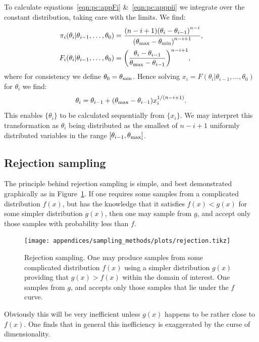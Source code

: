 To calculate equations~\eqref{eqn:pc:appFi} \&~\ref{eqn:pc:apppii} we integrate over the constant distribution, taking care with the limits. We find:
\begin{align}
  \pi_i(\theta_i|\theta_{i-1},\ldots,\theta_0) &= \frac{(n-i+1){(\theta_i-\theta_{i-1})}^{n-i}}{{(\theta_{\mathrm{max}}-\theta_{\mathrm{min}})}^{n-i+1}},\\
  F_i(\theta_i|\theta_{i-1},\ldots,\theta_0) &= {\left(\frac{\theta_i-\theta_{i-1}}{\theta_{\mathrm{max}}-\theta_{i-1}}\right)}^{n-i+1},
  \label{eqn:pc:sorted_uniform_calc}
\end{align}
where for consistency we define $\theta_0 = \theta_{\mathrm{min}}$. Hence solving $x_i=F(\theta_i|\theta_{i-1},\ldots,\theta_0)$ for $\theta_i$ we find:
\begin{equation}
  \theta_i = \theta_{i-1}+ (\theta_{\mathrm{max}}-\theta_{i-1})x_i^{1/(n-i+1)}.
  \label{eqn:pc:sorted_uniform_trans}
\end{equation}
This enables $\{\theta_i\}$ to be calculated sequentially from $\{x_i\}$. We may interpret this transformation as $\theta_i$ being distributed as the smallest of $n-i+1$ uniformly distributed variables in the range $[\theta_{i-1},\theta_{\mathrm{max}}]$.



\subsection{Rejection sampling}
\label{sec:sm:rejection}

The principle behind rejection sampling is simple, and best demonstrated graphically as in Figure~\ref{fig:sm:rej}. If one requires some samples from a complicated distribution $f(x)$, but has the knowledge that it satisfies $f(x)<g(x)$ for some simpler distribution $g(x)$, then one may sample from $g$, and accept only those samples with probability less than $f$. 

\begin{figure}[tp]
  \centering
  \texttt{[image: appendices/sampling\_methods/plots/rejection.tikz]}
  \caption{Rejection sampling. One may produce samples from some complicated distribution $f(x)$ using a simpler distribution $g(x)$ providing that $g(x)>f(x)$ within the domain of interest. One samples from $g$, and accepts only those samples that lie under the $f$ curve.\label{fig:sm:rej}}
\end{figure}

Obviously this will be very inefficient unless $g(x)$ happens to be rather close to $f(x)$. One finds that in general this inefficiency is exaggerated by the curse of dimensionality.

